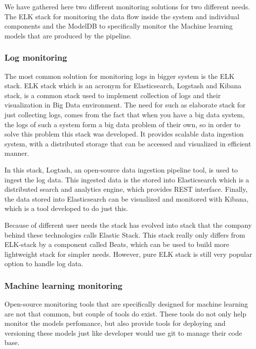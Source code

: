 We have gathered here two different monitoring solutions for two different needs.
The ELK stack for monitoring the data flow inside the system and individual components and the ModelDB to specifically monitor the Machine learning models that are produced by the pipeline.

\subsubsection{Log monitoring}

The most common solution for monitoring logs in bigger system is the ELK stack. 
ELK stack which is an acronym for Elasticsearch, Logstash and Kibana stack, is a common stack used to implement collection of logs and their visualization in Big Data environment.
The need for such as elaborate stack for just collecting logs, comes from the fact that when you have a big data system, the logs of such a system form a big data problem of their own, so in order to solve this problem this stack was developed.
It provides scalable data ingestion system, with a distributed storage that can be accessed and visualized in efficient manner. \cite{elastic}

In this stack, Logtash, an open-source data ingestion pipeline tool, is used to ingest the log data.
This ingested data is the stored into Elasticsearch which is a distributed search and analytics engine, which provides REST interface.
Finally, the data stored into Elasticsearch can be visualized and monitored with Kibana, which is a tool developed to do just this. \cite{elastic}

Because of different user needs the stack has evolved into stack that the company behind these technologies calls Elastic Stack.
This stack really only differs from ELK-stack by a component called Beats, which can be used to build more lightweight stack for simpler needs.
However, pure ELK stack is still very popular option to handle log data. \cite{elastic}

\subsubsection{Machine learning monitoring}

Open-source monitoring tools that are specifically designed for machine learning are not that common, but couple of tools do exist.
These tools do not only help monitor the models perfomance, but also provide tools for deploying and versioning these models just like developer would use git to manage their code base.

